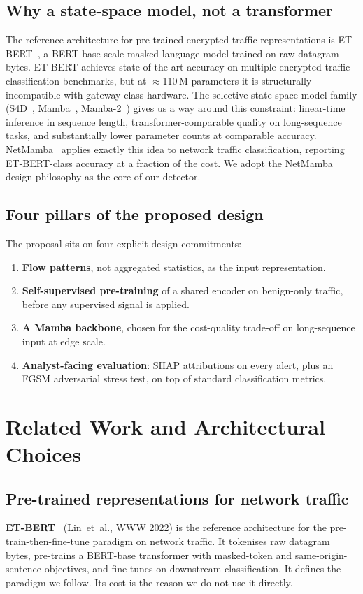 \documentclass[11pt,a4paper]{article}
\begin{document}
\subsection{Why a state-space model, not a transformer}
The reference architecture for pre-trained encrypted-traffic representations is ET-BERT~\cite{ETBERT}, a BERT-base-scale masked-language-model trained on raw datagram bytes. ET-BERT achieves state-of-the-art accuracy on multiple encrypted-traffic classification benchmarks, but at $\approx$110\,M parameters it is structurally incompatible with gateway-class hardware. The selective state-space model family (S4D~\cite{S4D}, Mamba~\cite{Mamba}, Mamba-2~\cite{SSD}) gives us a way around this constraint: linear-time inference in sequence length, transformer-comparable quality on long-sequence tasks, and substantially lower parameter counts at comparable accuracy. NetMamba~\cite{NetMamba} applies exactly this idea to network traffic classification, reporting ET-BERT-class accuracy at a fraction of the cost. We adopt the NetMamba design philosophy as the core of our detector.

\subsection{Four pillars of the proposed design}
The proposal sits on four explicit design commitments:
\begin{enumerate}[leftmargin=*, itemsep=2pt]
  \item \textbf{Flow patterns}, not aggregated statistics, as the input representation.
  \item \textbf{Self-supervised pre-training} of a shared encoder on benign-only traffic, before any supervised signal is applied.
  \item \textbf{A Mamba backbone}, chosen for the cost-quality trade-off on long-sequence input at edge scale.
  \item \textbf{Analyst-facing evaluation}: SHAP attributions on every alert, plus an FGSM adversarial stress test, on top of standard classification metrics.
\end{enumerate}

\section{Related Work and Architectural Choices}

\subsection{Pre-trained representations for network traffic}
\textbf{ET-BERT}~\cite{ETBERT} (Lin~et~al., WWW 2022) is the reference architecture for the pre-train-then-fine-tune paradigm on network traffic. It tokenises raw datagram bytes, pre-trains a BERT-base transformer with masked-token and same-origin-sentence objectives, and fine-tunes on downstream classification. It defines the paradigm we follow. Its cost is the reason we do not use it directly.
\end{document}
